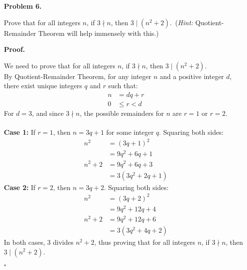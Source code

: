 \documentclass{article}
\newenvironment{problem}[1]{
    \begin{mdframed}[backgroundcolor=gray!20, skipabove=\baselineskip, skipbelow=\baselineskip, nobreak=true, innerleftmargin=10pt, innerrightmargin=10pt, innertopmargin=10pt, innerbottommargin=10pt]
    \textbf{Problem #1.}
}{
    \end{mdframed}
}
\newenvironment{proof}{
    \begin{mdframed}[nobreak=true, innerleftmargin=10pt, innerrightmargin=10pt, innertopmargin=10pt, innerbottommargin=10pt]
    \textbf{Proof.}
}{
    \hfill $\square$
    \end{mdframed}
}
\begin{document}
\begin{problem}{6}
    Prove that for all integers $n$, if $3 \nmid n$, then $3 \mid (n^2 +2)$.\ (\textit{Hint:} Quotient-Remainder Theorem will help immensely with this.)
\end{problem}
\begin{proof}
    We need to prove that for all integers $n$, if $3 \nmid n$, then $3 \mid (n^2 + 2)$. \\
    By Quotient-Remainder Theorem, for any integer $n$ and a positive integer $d$, there exist unique integers $q$ and $r$ such that:
    \begin{align*}
        n &= dq + r \\
        0 &\leq r < d
    \end{align*}
    For $d = 3$, and since $3 \nmid n$, the possible remainders for $n$ are $r = 1$ or $r = 2$. \\ \\
    \textbf{Case 1:} If $r = 1$, then $n = 3q + 1$ for some integer $q$. Squaring both sides:
    \begin{align*}
        n^2 &= {(3q + 1)}^2 \\
        &= 9q^2 + 6q + 1 \\
        n^2 + 2 &= 9q^2 + 6q + 3 \\
        &= 3(3q^2 + 2q + 1)
    \end{align*}
    \textbf{Case 2:} If $r = 2$, then $n = 3q + 2$. Squaring both sides:
    \begin{align*}
        n^2 &= {(3q + 2)}^2 \\
        &= 9q^2 + 12q + 4 \\
        n^2 + 2 &= 9q^2 + 12q + 6 \\
        &= 3(3q^2 + 4q + 2)
    \end{align*}
    In both cases, $3$ divides $n^2 + 2$, thus proving that for all integers $n$, if $3 \nmid n$, then $3 \mid (n^2 +2)$.
\end{proof}

\end{document}
